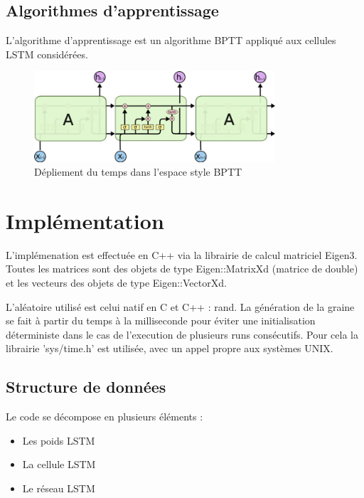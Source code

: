 \subsection{Algorithmes d'apprentissage}
L'algorithme d'apprentissage est un algorithme BPTT appliqué aux cellules
LSTM considérées.

\begin{figure}[!ht]
\begin{center}
\includegraphics[width=0.8\textwidth]{images/lstm-bptt.png}
\end{center}
\caption{Dépliement du temps dans l'espace style BPTT}
\end{figure}

\section{Implémentation}

L'implémenation est effectuée en C++ via la librairie de calcul matriciel
Eigen3. Toutes les matrices sont des objets de type Eigen::MatrixXd (matrice de
double) et les vecteurs des objets de type Eigen::VectorXd.

\medskip

L'aléatoire utilisé est celui natif en C et C++ : rand.
La génération de la graine se fait à partir du temps à la milliseconde pour
éviter une initialisation déterministe dans le cas de l'execution de plusieurs
runs consécutifs. Pour cela la librairie 'sys/time.h' est utilisée, avec un
appel propre aux systèmes UNIX.

\bigskip

\subsection{Structure de données}

Le code se décompose en plusieurs éléments :

\medskip

\begin{itemize}

  \item Les poids LSTM
  \item La cellule LSTM
  \item Le réseau LSTM

\end{itemize}
